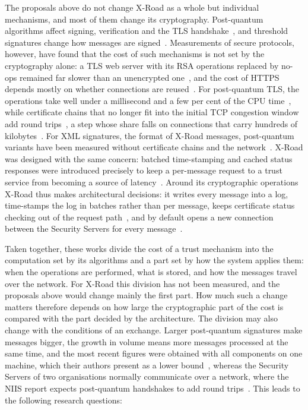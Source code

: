 \documentclass[conference,a4paper]{IEEEtran}
\newcommand{\newtext}[1]{{\color{blue}#1}}
\begin{document}
{\color{blue}
The proposals above do not change X-Road as a whole but individual mechanisms, and most of them
change its cryptography. Post-quantum algorithms affect signing, verification and the TLS
handshake~\cite{bakhtina2026pqc}, and threshold signatures change how messages are
signed~\cite{bakhtina2026ijis}. Measurements of secure protocols, however, have found that the cost of such mechanisms is not
set by the cryptography alone\newtext{: a TLS web server with its RSA operations replaced by no-ops
remained far slower than an unencrypted one~\cite{coarfa2006}, and the cost of HTTPS depends mostly
on whether connections are reused~\cite{naylor2014}. For post-quantum TLS, the operations take well
under a millisecond and a few per cent of the CPU time~\cite{abbasi2025,rahul2026,demir2026}, while
certificate chains that no longer fit into the initial TCP congestion window add round
trips~\cite{sikeridis2020,westerbaan2021,chou2026}, a step whose share falls on connections that
carry hundreds of kilobytes~\cite{kampanakis2024}. For XML signatures, the format of X-Road
messages, post-quantum variants have been measured without certificate chains and the
network~\cite{mueller2024}.} X-Road was designed with the same concern:
batched time-stamping and cached status responses were introduced precisely to keep a per-message
request to a trust service from becoming a source of latency~\cite{ansper2013}. Around its
cryptographic operations X-Road thus makes architectural decisions: it writes every message into a
log, time-stamps the log in batches rather than per message, keeps certificate status checking out
of the request path~\cite{ansper2013}, and by default opens a new connection between the Security
Servers for every message~\cite{xroadsyspar}.

Taken together, these works divide the cost of a trust mechanism into the computation set by its
algorithms and a part set by how the system applies them: when the operations are performed, what
is stored, and how the messages travel over the network. For X-Road this division has not been
measured, and the proposals above would change mainly the first part. How much such a change matters
therefore depends on how large the cryptographic part of the cost is compared with the part decided
by the architecture. The division may also change with the conditions of an exchange. Larger post-quantum
signatures make messages bigger, the growth in volume means more messages processed at the same time,
and the most recent figures were obtained with all components on one machine, which their authors
present as a lower bound~\cite{bakhtina2026ijis}, whereas the Security Servers of two organisations
normally communicate over a network, where the NIIS report expects post-quantum handshakes to add
round trips~\cite{bakhtina2026pqc}. This leads to the following research questions:

}
\end{document}

